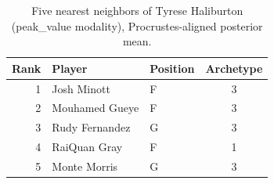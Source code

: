 \begin{table}[htbp]
  \centering\small
  \begin{tabular}{rllc}
    \toprule
    Rank & Player & Position & Archetype \\
    \midrule
    1 & Josh Minott & F & 3 \\
    2 & Mouhamed Gueye & F & 3 \\
    3 & Rudy Fernandez & G & 3 \\
    4 & RaiQuan Gray & F & 1 \\
    5 & Monte Morris & G & 3 \\
    \bottomrule
  \end{tabular}
  \caption{Five nearest neighbors of Tyrese Haliburton (peak_value modality), Procrustes-aligned posterior mean.}
  \label{tab:Tyrese_Haliburton_neighbors_peak_value}
\end{table}

